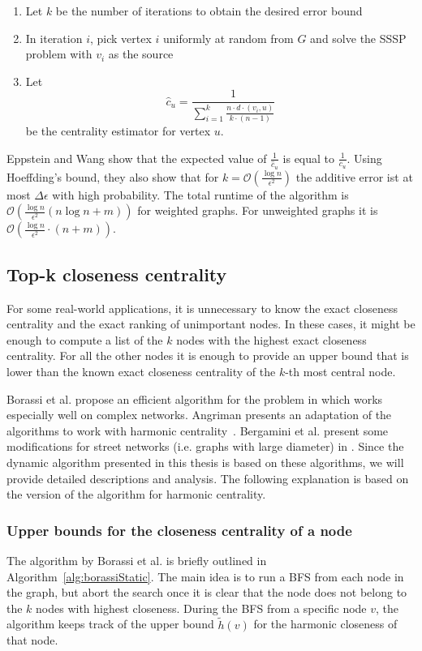 \begin{enumerate}
	\item Let $k$ be the number of iterations to obtain the desired error bound
	\item In iteration $i$, pick vertex $i$ uniformly at random from $G$ and solve the SSSP problem with $v_i$ as the source
	\item Let
		\[
			\hat{c}_u = \frac{1}{\sum_{i = 1}^{k}{\frac{n \cdot d \cdot (v_i, u)}{k \cdot (n - 1)}}} 	
		\] be the centrality estimator for vertex $u$.
\end{enumerate}
Eppstein and Wang show that the expected value of $\frac{1}{\hat{c}_u}$ is equal to $\frac{1}{c_u}$. Using Hoeffding's bound, they also show that for $k = \mathcal{O}(\frac{\log{n}}{\epsilon^2})$ the additive error ist at most $\Delta \epsilon$ with high probability. The total runtime of the algorithm is $\mathcal{O}\left(\frac{\log{n}}{\epsilon^2} (n \log{n} + m)\right)$ for weighted graphs. For unweighted graphs it is $\mathcal{O}\left(\frac{\log{n}}{\epsilon^2} \cdot (n + m)\right)$.

\subsection{Top-k closeness centrality}
For some real-world applications, it is unnecessary to know the exact closeness centrality and the exact ranking of unimportant nodes. In these cases, it might be enough to compute a list of the $k$ nodes with the highest exact closeness centrality. For all the other nodes it is enough to provide an upper bound that is lower than the known exact closeness centrality of the $k$-th most central node.

Borassi et al. propose an efficient algorithm for the problem in \cite{borassi2015fast} which works especially well on complex networks. Angriman presents an adaptation of the algorithms to work with harmonic centrality~\cite{angriman2016efficient}. Bergamini et al. present some modifications for street networks (i.e. graphs with large diameter) in \cite{bergamini2016computing}. Since the dynamic algorithm presented in this thesis is based on these algorithms, we will provide detailed descriptions and analysis. The following explanation is based on the version of the algorithm for harmonic centrality.

\subsubsection{Upper bounds for the closeness centrality of a node}
\label{sec:borassiUpperBound}
The algorithm by Borassi et al. is briefly outlined in Algorithm~\ref{alg:borassiStatic}. The main idea is to run a BFS from each node in the graph, but abort the search once it is clear that the node does not belong to the $k$ nodes with highest closeness. During the BFS from a specific node $v$, the algorithm keeps track of the upper bound $\widetilde{h}(v)$ for the harmonic closeness of that node.


